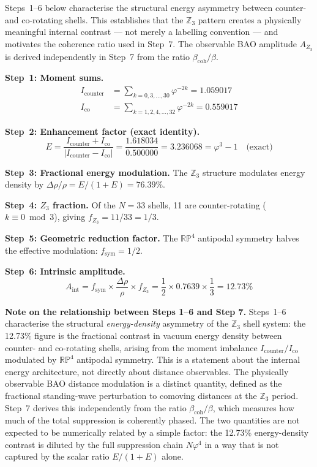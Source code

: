 \documentclass[12pt,a4paper]{article}
\begin{document}
Steps~1--6 below characterise the structural energy asymmetry between counter-
and co-rotating shells. This establishes that the $\mathbb{Z}_3$ pattern creates
a physically meaningful internal contrast --- not merely a labelling convention ---
and motivates the coherence ratio used in Step~7. The observable BAO amplitude
$A_{Z_3}$ is derived independently in Step~7 from the ratio $\beta_\mathrm{coh}/\beta$.

\textbf{Step~1: Moment sums.}
\begin{align*}
  I_\mathrm{counter} &= \sum_{k=0,3,\ldots,30} \varphi^{-2k} = 1.059017 \\
  I_\mathrm{co}      &= \sum_{k=1,2,4,\ldots,32} \varphi^{-2k} = 0.559017
\end{align*}

\textbf{Step~2: Enhancement factor (exact identity).}
\begin{equation}
  E = \frac{I_\mathrm{counter} + I_\mathrm{co}}{|I_\mathrm{counter} - I_\mathrm{co}|}
  = \frac{1.618034}{0.500000} = 3.236068 = \varphi^3-1 \quad \text{(exact)}
\end{equation}

\textbf{Step~3: Fractional energy modulation.}
The $\mathbb{Z}_3$ structure modulates energy density by $\Delta\rho/\rho = E/(1+E) = 76.39\%$.

\textbf{Step~4: $Z_3$ fraction.}
Of the $N = 33$ shells, 11 are counter-rotating ($k \equiv 0 \bmod 3$), giving
$f_{Z_3} = 11/33 = 1/3$.

\textbf{Step~5: Geometric reduction factor.}
The $\mathbb{RP}^4$ antipodal symmetry halves the effective modulation:
$f_\mathrm{sym} = 1/2$.

\textbf{Step~6: Intrinsic amplitude.}
\begin{equation}
  A_\mathrm{int} = f_\mathrm{sym} \times \frac{\Delta\rho}{\rho} \times f_{Z_3}
  = \frac{1}{2} \times 0.7639 \times \frac{1}{3} = 12.73\%
\end{equation}

\textbf{Note on the relationship between Steps 1--6 and Step 7.}
Steps~1--6 characterise the structural \emph{energy-density} asymmetry of the
$\mathbb{Z}_3$ shell system: the 12.73\% figure is the fractional contrast in
vacuum energy density between counter- and co-rotating shells, arising from the
moment imbalance $I_\mathrm{counter}/I_\mathrm{co}$ modulated by $\mathbb{RP}^4$
antipodal symmetry. This is a statement about the internal energy architecture,
not directly about distance observables. The physically observable BAO distance
modulation is a distinct quantity, defined as the fractional standing-wave perturbation
to comoving distances at the $\mathbb{Z}_3$ period. Step~7 derives this independently
from the ratio $\beta_\mathrm{coh}/\beta$, which measures how much of the total
suppression is coherently phased. The two quantities are not expected to be
numerically related by a simple factor: the 12.73\% energy-density contrast is
diluted by the full suppression chain $N\varphi^4$ in a way that is not captured
by the scalar ratio $E/(1+E)$ alone.
\end{document}
